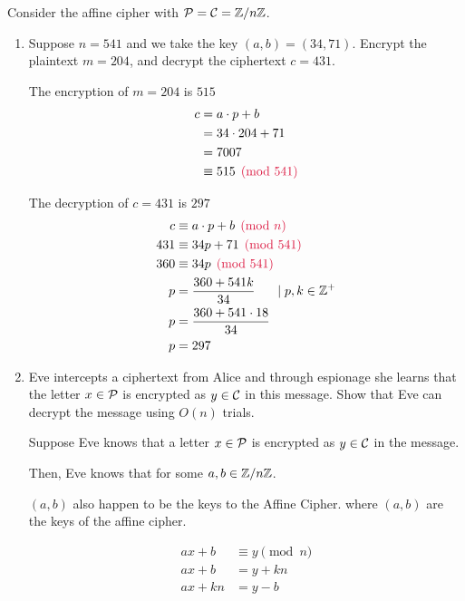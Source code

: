 \begin{problem}
Consider the affine cipher with $\mathcal{P}=\mathcal{C}=\mathbb{Z}/n\mathbb{Z}$.  
\begin{enumerate}\renewcommand{\itemsep}{3mm}
\item Suppose $n=541$ and we take the key $(a,b)=(34,71)$.  Encrypt the plaintext $m=204$, and decrypt the ciphertext $c=431$.
\begin{Answer}
\noindent
The encryption of $m=204$ is $515$
\begin{align*}
  c &= a \cdot p + b\\
  &= 34 \cdot 204 + 71\\
  &= 7007\\
  &\equiv 515 \crim{\pmod{541}}
\end{align*}

\noindent
The decryption of $c=431$ is $297$
\begin{align*}
  c &\equiv a \cdot p + b \crim{\pmod n}\\
  431 &\equiv 34p + 71 \crim{\pmod{541}}\\
  360 &\equiv 34p \crim{\pmod{541}}\\
  p &= \frac{360 + 541k}{34}  \hspace{15pt}\mid p,k \in \Z^+\\
  p &= \frac{360 + 541\cdot 18}{34}\\
  p &= 297
\end{align*}

\end{Answer}

\item Eve intercepts a ciphertext from Alice
and through espionage she learns that the letter
$x \in \mathcal{P}$ is encrypted as $y \in \mathcal{C}$ in this message.
Show that Eve can decrypt the message using $O(n)$ trials.  
\begin{Answer}

Suppose Eve knows that a letter $x \in \mathcal{P}$ is encrypted as
$y \in \mathcal{C}$ in the message.

\noindent
Then, Eve knows that  for some $a, b \in \mathbb{Z}/n\mathbb{Z}$.

\noindent $(a, b)$ also happen to be the keys to the Affine Cipher.
where $(a, b)$ are the keys of the affine cipher.

\begin{align*}
  ax + b &\equiv y \pmod n\\
  ax + b &= y + kn\\
  ax + kn &= y - b\\
\end{align*}


\end{Answer}
\end{enumerate}
\end{problem}
